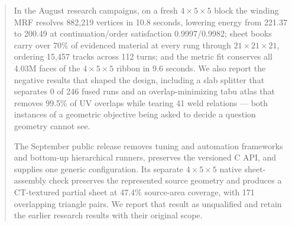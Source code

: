 \documentclass[acmtog,nonacm]{acmart}
\begin{document}
\begin{abstract}
In the August research campaigns, on a fresh $4\times5\times5$ block the winding MRF resolves 882,219 vertices in 10.8 seconds, lowering energy from 221.37 to 200.49 at continuation/order satisfaction 0.9997/0.9982; sheet books carry over 70\% of evidenced material at every rung through $21\times21\times21$, ordering 15,457 tracks across 112 turns; and the metric fit conserves all 4.03M faces of the $4\times5\times5$ ribbon in 9.6 seconds. We also report the negative results that shaped the design, including a slab splitter that separates 0 of 246 fused runs and an overlap-minimizing tabu atlas that removes 99.5\% of UV overlaps while tearing 41 weld relations --- both instances of a geometric objective being asked to decide a question geometry cannot see.

The September public release removes tuning and automation frameworks and bottom-up hierarchical runners, preserves the versioned C API, and supplies one generic configuration. Its separate $4\times5\times5$ native sheet-assembly check preserves the represented source geometry and produces a CT-textured partial sheet at 47.4\% source-area coverage, with 171 overlapping triangle pairs. We report that result as unqualified and retain the earlier research results with their original scope.
\end{abstract}
\end{document}
